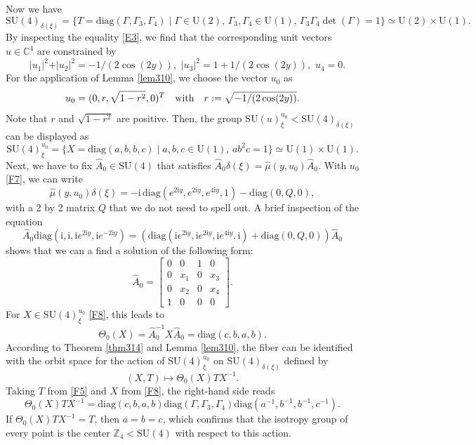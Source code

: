 \documentclass[a4paper,11pt,reqno]{amsart}
\theoremstyle{definition}
\numberwithin{equation}{section}
\newcommand{\be}{\begin{equation}}
\newcommand{\ee}{\end{equation}}
\def\ri{{\mathrm{i}}}                       %
\def\bC{{\mathbb C}}                        %
\def\bZ{{\mathbb Z}}                        %
\def\diag{\mathrm{diag}}                    %
\def\SU{\mathrm{SU}}                        %
\def\U{\mathrm{U}}                          %
\begin{document}
Now we have
\be
\SU(4)_{\delta(\xi)} = \{T= \diag (\Gamma, \Gamma_3, \Gamma_4) \mid \Gamma \in \U(2),\, \Gamma_3,
\Gamma_4\in \U(1),\, \Gamma_3 \Gamma_4 \det(\Gamma) =1 \} \simeq \U(2) \times \U(1).
\label{F5}\ee
By inspecting the equality \eqref{E3}, we find that the corresponding  unit vectors $u\in \bC^4$ are constrained  by
\be
 \quad \vert u_1 \vert^2 + \vert u_2 \vert^2 = - 1/(2 \cos(2y)), \,\,
\vert u_3\vert^2 = 1 + 1/(2 \cos(2y)), \,\,  u_4 =0.
\label{F6}\ee
For the application of Lemma \ref{lem310}, we  choose the vector $u_0$ as
\be
u_0 = (0, r, \sqrt{1-r^2}, 0)^T \quad \hbox{with}\quad r: =  \sqrt{- 1/(2\cos(2y))}.
\label{F7}\ee
Note that $r$ and $\sqrt{1-r^2}$ are positive.
Then, the group $\SU(u)_\xi^{u_0} < \SU(4)_{\delta(\xi)}$  can be displayed as
\be
\SU(4)_\xi^{u_0} =\{ X= \diag(a, b, b, c) \mid a,b,c \in \U(1),\,  ab^2c=1\} \simeq \U(1) \times \U(1).
\label{F8}\ee
Next, we have to fix  $\hat A_0 \in \SU(4)$ that satisfies $\hat A_0 \delta(\xi)  =  \hat \mu(y, u_0) \hat A_0$.
With $u_0$ \eqref{F7}, we can write
\be
\hat \mu(y, u_0) \delta(\xi)  = -\ri \,\diag( e^{2\ri y}, e^{2\ri y}, e^{4\ri y}, 1) - \diag(0,Q, 0),
\label{F9}\ee
with a  2 by 2 matrix  $Q$ that we do not need to spell out.
A brief inspection of the equation
\be
  \hat A_0  \diag(\ri,\ri, \ri e^{2\ri y}, \ri e^{-2\ri y})   = \left( \diag(\ri e^{2\ri y},
  \ri e^{2\ri y}, \ri e^{4\ri y}, \ri )   + \diag(0, Q, 0)\right)  \hat A_0
 \label{F10}\ee
  shows that we can a find a solution of the  following form:
\be
\hat A_0 = \begin{bmatrix}
0&0&1&0\\
0& x_1 & 0& x_3 \\
0& x_2 & 0& x_4 \\
1 & 0&0&0
\end{bmatrix} .
\label{F11}\ee
For $X\in \SU(4)_\xi^{u_0}$ \eqref{F8}, this leads to
\be
\Theta_0(X) = \hat A_0^{-1} X \hat A_0 = \diag(c,b,a,b).
\label{F12}\ee
According to Theorem \ref{thm314} and Lemma \ref{lem310}, the fiber can be identified with the orbit space for the
action of $\SU(4)_\xi^{u_0}$ on $\SU(4)_{\delta(\xi)}$   defined by
\be
(X, T) \mapsto \Theta_0(X) T X^{-1}.
\label{F13}\ee
Taking $T$ from \eqref{F5} and $X$ from \eqref{F8}, the right-hand side reads
\be
\Theta_0(X) T X^{-1}  = \diag(c,b, a,b) \diag(\Gamma, \Gamma_3, \Gamma_4) \diag(a^{-1}, b^{-1}, b^{-1}, c^{-1}).
\label{F14} \ee
If $\Theta_0(X) T X^{-1} = T$, then $a=b=c$, which confirms that the isotropy group of every point is the center $\bZ_4< \SU(4)$ with respect to this action.
\end{document}
